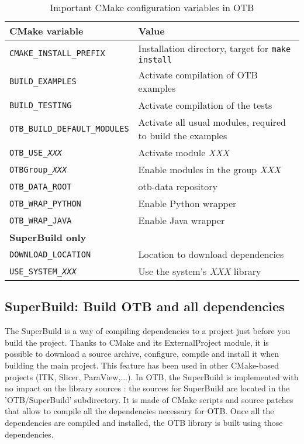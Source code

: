 \begin{center}
\begin{tiny}
\begin{table}[!htbp]
\begin{tabular}{p{}p{}}
\hline
\textbf{CMake variable} & \textbf{Value} \\
\hline
\texttt{CMAKE\_INSTALL\_PREFIX}         & Installation directory, target for \texttt{make install} \\
\texttt{BUILD\_EXAMPLES}                & Activate compilation of OTB examples \\
\texttt{BUILD\_TESTING}                 & Activate compilation of the tests \\
\texttt{OTB\_BUILD\_DEFAULT\_MODULES}   & Activate all usual modules, required to build the examples \\
\texttt{OTB\_USE\_\textit{XXX}}         & Activate module \textit{XXX} \\
\texttt{OTBGroup\_\textit{XXX}}         & Enable modules in the group \textit{XXX} \\
\texttt{OTB\_DATA\_ROOT}                & otb-data repository \\
\texttt{OTB\_WRAP\_PYTHON}              & Enable Python wrapper \\
\texttt{OTB\_WRAP\_JAVA}                & Enable Java wrapper \\

\hline
\multicolumn{2}{l}{\small \textbf{SuperBuild only}} \\ 
\texttt{DOWNLOAD\_LOCATION}             & Location to download dependencies \\
\texttt{USE\_SYSTEM\_\textit{XXX}}      & Use the system's \textit{XXX} library \\

\hline
\end{tabular}
\caption{Important CMake configuration variables in OTB}
\label{tab:installation-cmake-variables}
\end{table}
\end{tiny}
\end{center}

\subsection{SuperBuild: Build OTB and all dependencies}
\label{sec:installation-linux-superbuild}

The SuperBuild is a way of compiling dependencies to a project just before you build the project. Thanks to CMake and
its ExternalProject module, it is possible to download a source archive, configure, compile and install it when building
the main project. This feature has been used in other CMake-based projects (ITK, Slicer, ParaView,...).
In OTB, the SuperBuild is implemented with no impact on the library sources : the sources for SuperBuild are located in
the 'OTB/SuperBuild' subdirectory. It is made of CMake scripts and source patches that allow to compile all the
dependencies necessary for OTB. Once all the dependencies are compiled and installed, the OTB library is built using
those dependencies.

